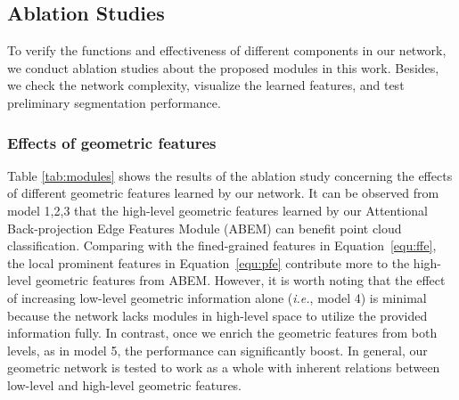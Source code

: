 \documentclass[journal,twoside]{IEEEtran}
\newcommand{\latinphrase}[1]{\textit{#1}}
\newcommand{\ie}{\latinphrase{i.e.}\xspace}
\begin{document}
\subsection{Ablation Studies}
To verify the functions and effectiveness of different components in our network, we conduct ablation studies about the proposed modules in this work. Besides, we check the network complexity, visualize the learned features, and test preliminary segmentation performance.

\subsubsection{Effects of geometric features}
Table \ref{tab:modules} shows the results of the ablation study concerning the effects of different geometric features learned by our network. It can be observed from model 1,2,3 that the high-level geometric features learned by our Attentional Back-projection Edge Features Module (ABEM) can benefit point cloud classification. Comparing with the fined-grained features in Equation~\ref{equ:ffe}, the local prominent features in Equation~\ref{equ:pfe} contribute more to the high-level geometric features from ABEM. However, it is worth noting that the effect of increasing low-level geometric information alone (\ie, model 4) is minimal because the network lacks modules in high-level space to utilize the provided information fully. In contrast, once we enrich the geometric features from both levels, as in model 5, the performance can significantly boost. In general, our geometric network is tested to work as a whole with inherent relations between low-level and high-level geometric features.

\begin{table}
\begin{center}
\caption{Complexity of classification network on \emph{ModelNet40}. (the inference time of our model running on GeForce GTX 2080Ti can be reduced to \emph{17.5ms})}
\end{center}
\end{table}
\end{document}
